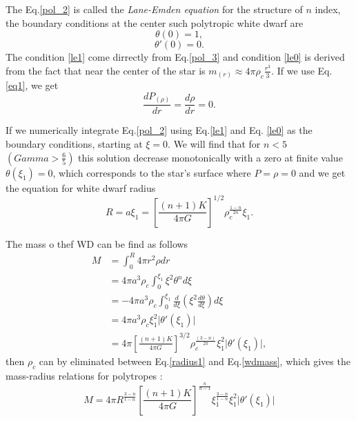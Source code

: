 \documentclass[oneside,a4paper,11pt]{report}
\begin{document}
The Eq.\eqref{pol_2} is called the \textit{Lane-Emden equation} for the structure of $n$ index, the boundary 
conditions at the center such polytropic white dwarf are
\begin{equation}
\label{le1}
 \theta(0) = 1, 
\end{equation}
\begin{equation}
\label{le0}
 \theta'(0)= 0.
\end{equation}
The condition \eqref{le1} come dirrectly from Eq.\eqref{pol_3} and condition \eqref{le0} is derived from the fact 
that near the center of the star is $m_{(r)} \approx 4\pi \rho_c \frac{r^3}{3}$. If we use Eq.\eqref{eq1}, we get
\begin{equation}
 \frac{dP_{(\rho)}}{dr} = \frac{d\rho}{dr} = 0 .
\end{equation}

If we numerically integrate Eq.\eqref{pol_2} using Eq.\eqref{le1} and Eq. \eqref{le0} as the boundary conditions, 
starting at $\xi=0$. We will find that for $n<5$ $(Gamma>\frac{6}{5})$ this solution decrease monotonically with a zero 
at finite value $\theta(\xi_1) = 0$, which corresponds to the star's surface where $P=\rho = 0$ and we get the 
equation for white dwarf radius 
\begin{equation}
 \label{radius1}
R = a\xi_1 = \left[ \frac{(n+1)K}{4\pi G} \right]^{1/2}\rho_c^{\frac{1-n}{2n}}\xi_1.
\end{equation}

The mass o thef WD can be find as follows
\begin{equation}
 \label{wdmass}
\begin{split}
M &= \int_{0}^{R} 4\pi r^2 \rho dr \\
  &= 4 \pi a^3 \rho_c \int_{0}^{\xi_1} \xi^2 \theta^n d\xi \\
  &= -4 \pi a^3 \rho_c \int_{0}^{\xi_1}\frac{d}{d\xi}\left( \xi^2 \frac{d\theta}{d\xi}\right)d\xi \\
  &= 4 \pi a^3 \rho_c \xi_1^2 \lvert \theta' (\xi_1) \lvert \\
  & = 4 \pi \left[ \frac{(n+1)K}{4 \pi G}\right]^{3/2} \rho_c^{\frac{(3-n)}{2\pi}}\xi_1^2 \lvert \theta' (\xi_1)\lvert ,
\end{split}
\end{equation}
then $\rho_c$ can by eliminated between Eq.\eqref{radius1} and Eq.\eqref{wdmass}, which gives the mass-radius relations 
for polytropes \citet{2004bhwd.book.....S}:  
\begin{equation}
\label{mr_eq}
 M = 4 \pi R^{\frac{3-n}{t-n}}\left[ \frac{(n+1)K}{4 \pi G}\right]^{\frac{n}{n-1}}
\xi_1^{\frac{3-n}{1-n}}\xi_1^2\lvert\theta' (\xi_1) \lvert
\end{equation}
  
\end{document}
